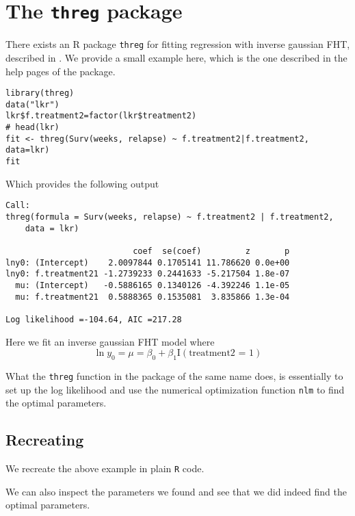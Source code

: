 \section{The \texttt{threg} package}
There exists an R package \texttt{threg} for fitting regression with inverse gaussian FHT, described in \cite{threg}. We provide a small example here, which is the one described in the help pages of the package.
\begin{lstlisting}
library(threg)
data("lkr")
lkr$f.treatment2=factor(lkr$treatment2)
# head(lkr)
fit <- threg(Surv(weeks, relapse) ~ f.treatment2|f.treatment2, data=lkr)
fit
\end{lstlisting}
Which provides the following output
\begin{verbatim}
Call:
threg(formula = Surv(weeks, relapse) ~ f.treatment2 | f.treatment2, 
    data = lkr)

                          coef  se(coef)         z       p
lny0: (Intercept)    2.0097844 0.1705141 11.786620 0.0e+00
lny0: f.treatment21 -1.2739233 0.2441633 -5.217504 1.8e-07
  mu: (Intercept)   -0.5886165 0.1340126 -4.392246 1.1e-05
  mu: f.treatment21  0.5888365 0.1535081  3.835866 1.3e-04

Log likelihood =-104.64, AIC =217.28
\end{verbatim}
Here we fit an inverse gaussian FHT model where
\[
    \ln y_0=\mu=\beta_0+\beta_1\text{I}(\text{treatment2 = 1})
\]

What the \verb|threg| function in the package of the same name does, is essentially to set up the log likelihood and use the numerical optimization function \verb|nlm| to find the optimal parameters.

\subsection{Recreating}
We recreate the above example in plain \verb|R| code.


We can also inspect the parameters we found and see that we did indeed find the optimal parameters.